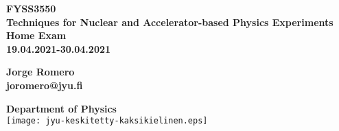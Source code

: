 \begin{titlepage}
	
    \begin{center}
        
        \LARGE{\textbf{FYSS3550}}\\
        \large{\textbf{Techniques for Nuclear and Accelerator-based Physics Experiments}}\\
        \vspace{0.15\textheight}
        \LARGE{\textbf{Home Exam}}\\
        \vspace{0.05\textheight}
        \large{\textbf{19.04.2021-30.04.2021}}\\
    \end{center}
    \vspace{0.08\textheight}
    \begin{center}
       \large{\textbf{Jorge Romero}}\\\large{\textbf{joromero@jyu.fi}}
    \end{center}
    \vspace{0.05\textheight}
    \centering

        \large{\textbf{Department of Physics}}\\
    \centering
    \vfill
    \texttt{[image: jyu-keskitetty-kaksikielinen.eps]}

\end{titlepage}